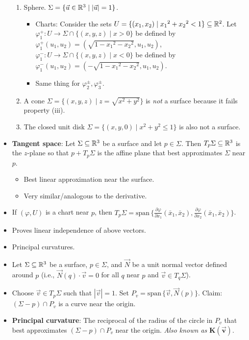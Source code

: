 \documentclass[../main.tex]{subfiles}
\begin{document}
\begin{itemize}
\begin{enumerate}[label={\Alph*)}]
        \item Sphere. $\Sigma=\{\vec{u}\in\mathbb{R}^3\mid|\vec{u}|=1\}$.
        \begin{itemize}
            \item Charts: Consider the sets $U=\{(x_1,x_2)\mid {x_1}^2+{x_2}^2<1\}\subseteq\mathbb{R}^2$. Let $\varphi_1^+:U\to\Sigma\cap\{(x,y,z)\mid x>0\}$ be defined by $\varphi_1^+(u_1,u_2)=(\sqrt{1-{x_1}^2-{x_2}^2},u_1,u_2)$, $\varphi_1^-:U\to\Sigma\cap\{(x,y,z)\mid x<0\}$ be defined by $\varphi_1^-(u_1,u_2)=(-\sqrt{1-{x_1}^2-{x_2}^2},u_1,u_2)$.
            \item Same thing for $\varphi_2^\pm,\varphi_3^\pm$.
        \end{itemize}
        \item A cone $\Sigma=\{(x,y,z)\mid z=\sqrt{x^2+y^2}\}$ is \emph{not} a surface because it fails property (iii).
        \item The closed unit disk $\Sigma=\{(x,y,0)\mid x^2+y^2\leq 1\}$ is also not a surface.
    \end{enumerate}
    \item \textbf{Tangent space}: Let $\Sigma\subseteq\mathbb{R}^3$ be a surface and let $p\in\Sigma$. Then $T_p\Sigma\subseteq\mathbb{R}^3$ is the $z$-plane so that $p+T_p\Sigma$ is the affine plane that best approximates $\Sigma$ near $p$.
    \begin{itemize}
        \item Best linear approximation near the surface.
        \item Very similar/analogous to the derivative.
    \end{itemize}
    \item If $(\varphi,U)$ is a chart near $p$, then $T_p\Sigma=\text{span}\,\{\frac{\partial\varphi}{\partial x_1}(\bar{x}_1,\bar{x}_2),\frac{\partial\varphi}{\partial x_2}(\bar{x}_1,\bar{x}_2)\}$.
    \item Proves linear independence of above vectors.
    \item Principal curvatures.
    \item Let $\Sigma\subseteq\mathbb{R}^3$ be a surface, $p\in\Sigma$, and $\vec{N}$ be a unit normal vector defined around $p$ (i.e., $\vec{N}(q)\cdot\vec{v}=0$ for all $q$ near $p$ and $\vec{v}\in T_q\Sigma$).
    \item Choose $\vec{v}\in T_p\Sigma$ such that $|\vec{v}|=1$. Set $P_v=\text{span}\,\{\vec{v},\vec{N}(p)\}$. Claim: $(\Sigma-p)\cap P_v$ is a curve near the origin.
    \item \textbf{Principal curvature}: The reciprocal of the radius of the circle in $P_v$ that best approximates $(\Sigma-p)\cap P_v$ near the origin. \emph{Also known as} $\bm{K(\vec{v})}$.

\end{itemize}
\end{document}
